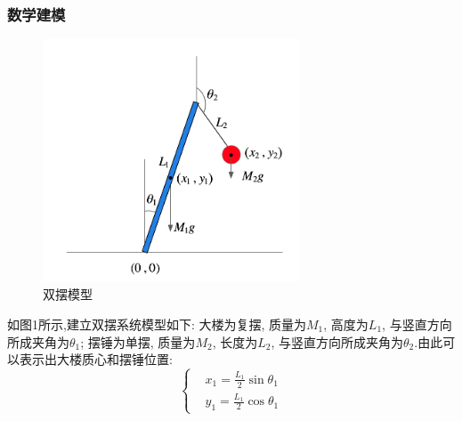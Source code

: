 \documentclass[10.5pt,a4paper]{ctexart}
\begin{document}
\subsubsection*{数学建模}
\begin{figure}[htbp]
	\begin{center}
		\includegraphics[width=3in]{figs/primary.png}
	\end{center}
	\caption{双摆模型}
\end{figure}

如图1所示,建立双摆系统模型如下: 大楼为复摆, 质量为$M_1$, 高度为$L_1$, 与竖直方向所成夹角为$\theta_1$; 
摆锤为单摆, 质量为$M_2$, 长度为$L_2$, 与竖直方向所成夹角为$\theta_2$.由此可以表示出大楼质心和摆锤位置:\\
\begin{equation}
\left \{ 
  \begin{aligned}
  &x_1 = \frac{L_1}{2} \sin{\theta_1}\\
  &y_1 = \frac{L_1}{2} \cos{\theta_1}
  \end{aligned}
\right.
\end{equation}
\end{document}
